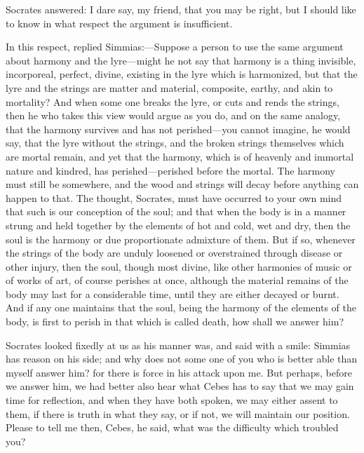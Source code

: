 \documentclass[11pt,letter]{article}
\begin{document}
\par  Socrates answered: I dare say, my friend, that you may be right, but I should like to know in what respect the argument is insufficient.

\par  In this respect, replied Simmias:—Suppose a person to use the same argument about harmony and the lyre—might he not say that harmony is a thing invisible, incorporeal, perfect, divine, existing in the lyre which is harmonized, but that the lyre and the strings are matter and material, composite, earthy, and akin to mortality? And when some one breaks the lyre, or cuts and rends the strings, then he who takes this view would argue as you do, and on the same analogy, that the harmony survives and has not perished—you cannot imagine, he would say, that the lyre without the strings, and the broken strings themselves which are mortal remain, and yet that the harmony, which is of heavenly and immortal nature and kindred, has perished—perished before the mortal. The harmony must still be somewhere, and the wood and strings will decay before anything can happen to that. The thought, Socrates, must have occurred to your own mind that such is our conception of the soul; and that when the body is in a manner strung and held together by the elements of hot and cold, wet and dry, then the soul is the harmony or due proportionate admixture of them. But if so, whenever the strings of the body are unduly loosened or overstrained through disease or other injury, then the soul, though most divine, like other harmonies of music or of works of art, of course perishes at once, although the material remains of the body may last for a considerable time, until they are either decayed or burnt. And if any one maintains that the soul, being the harmony of the elements of the body, is first to perish in that which is called death, how shall we answer him?

\par  Socrates looked fixedly at us as his manner was, and said with a smile: Simmias has reason on his side; and why does not some one of you who is better able than myself answer him? for there is force in his attack upon me. But perhaps, before we answer him, we had better also hear what Cebes has to say that we may gain time for reflection, and when they have both spoken, we may either assent to them, if there is truth in what they say, or if not, we will maintain our position. Please to tell me then, Cebes, he said, what was the difficulty which troubled you?
\end{document}
